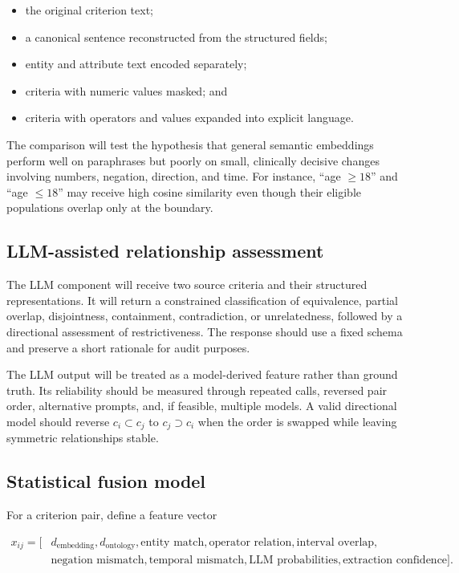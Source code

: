 \documentclass[11pt]{article}
\begin{document}
\begin{itemize}
    \item the original criterion text;
    \item a canonical sentence reconstructed from the structured fields;
    \item entity and attribute text encoded separately;
    \item criteria with numeric values masked; and
    \item criteria with operators and values expanded into explicit language.
\end{itemize}

The comparison will test the hypothesis that general semantic embeddings perform well on paraphrases but poorly on small, clinically decisive changes involving numbers, negation, direction, and time. For instance, ``age $\geq18$'' and ``age $\leq18$'' may receive high cosine similarity even though their eligible populations overlap only at the boundary.

\subsection{LLM-assisted relationship assessment}

The LLM component will receive two source criteria and their structured representations. It will return a constrained classification of equivalence, partial overlap, disjointness, containment, contradiction, or unrelatedness, followed by a directional assessment of restrictiveness. The response should use a fixed schema and preserve a short rationale for audit purposes.

The LLM output will be treated as a model-derived feature rather than ground truth. Its reliability should be measured through repeated calls, reversed pair order, alternative prompts, and, if feasible, multiple models. A valid directional model should reverse $c_i\subset c_j$ to $c_j\supset c_i$ when the order is swapped while leaving symmetric relationships stable.

\subsection{Statistical fusion model}

For a criterion pair, define a feature vector

\[
\begin{aligned}
x_{ij}=\big[&d_{\mathrm{embedding}},d_{\mathrm{ontology}},
\text{entity match},\text{operator relation},\text{interval overlap},\\
&\text{negation mismatch},\text{temporal mismatch},
\text{LLM probabilities},\text{extraction confidence}\big].
\end{aligned}
\]
\end{document}
